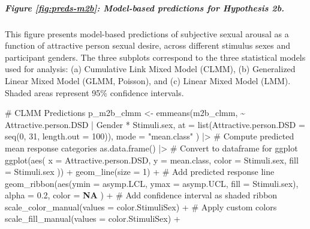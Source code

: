 \documentclass[
  bookmarksnumbered]{article}
\newenvironment{Shaded}{\begin{snugshade}}{\end{snugshade}}
\newcommand{\AttributeTok}[1]{\textcolor[rgb]{0.80,0.80,0.80}{#1}}
\newcommand{\CommentTok}[1]{\textcolor[rgb]{0.50,0.62,0.50}{#1}}
\newcommand{\ConstantTok}[1]{\textcolor[rgb]{0.86,0.64,0.64}{\textbf{#1}}}
\newcommand{\DecValTok}[1]{\textcolor[rgb]{0.86,0.86,0.80}{#1}}
\newcommand{\FloatTok}[1]{\textcolor[rgb]{0.75,0.75,0.82}{#1}}
\newcommand{\FunctionTok}[1]{\textcolor[rgb]{0.94,0.94,0.56}{#1}}
\newcommand{\NormalTok}[1]{\textcolor[rgb]{0.80,0.80,0.80}{#1}}
\newcommand{\OtherTok}[1]{\textcolor[rgb]{0.94,0.94,0.56}{#1}}
\newcommand{\SpecialCharTok}[1]{\textcolor[rgb]{0.86,0.64,0.64}{#1}}
\newcommand{\StringTok}[1]{\textcolor[rgb]{0.80,0.58,0.58}{#1}}
\begin{document}
\subparagraph{Figure \ref{fig:preds-m2b}: Model-based predictions for Hypothesis 2b.}\label{figure-reffigpreds-m2b-model-based-predictions-for-hypothesis-2b.}

This figure presents model-based predictions of subjective sexual arousal as a function of attractive person sexual desire, across different stimulus sexes and participant genders. The three subplots correspond to the three statistical models used for analysis: (a) Cumulative Link Mixed Model (CLMM), (b) Generalized Linear Mixed Model (GLMM, Poisson), and (c) Linear Mixed Model (LMM). Shaded areas represent 95\% confidence intervals.

\begin{Shaded}
\begin{Highlighting}[]
\CommentTok{\# CLMM Predictions}
\NormalTok{p\_m2b\_clmm }\OtherTok{\textless{}{-}} \FunctionTok{emmeans}\NormalTok{(m2b\_clmm, }\SpecialCharTok{\textasciitilde{}}\NormalTok{ Attractive.person.DSD }\SpecialCharTok{|}\NormalTok{ Gender }\SpecialCharTok{*}\NormalTok{ Stimuli.sex,}
  \AttributeTok{at =} \FunctionTok{list}\NormalTok{(}\AttributeTok{Attractive.person.DSD =} \FunctionTok{seq}\NormalTok{(}\DecValTok{0}\NormalTok{, }\DecValTok{31}\NormalTok{, }\AttributeTok{length.out =} \DecValTok{100}\NormalTok{)),}
  \AttributeTok{mode =} \StringTok{"mean.class"}
\NormalTok{) }\SpecialCharTok{|\textgreater{}} \CommentTok{\# Compute predicted mean response categories}
  \FunctionTok{as.data.frame}\NormalTok{() }\SpecialCharTok{|\textgreater{}} \CommentTok{\# Convert to dataframe for ggplot}
  \FunctionTok{ggplot}\NormalTok{(}\FunctionTok{aes}\NormalTok{(}
    \AttributeTok{x =}\NormalTok{ Attractive.person.DSD, }\AttributeTok{y =}\NormalTok{ mean.class,}
    \AttributeTok{color =}\NormalTok{ Stimuli.sex, }\AttributeTok{fill =}\NormalTok{ Stimuli.sex}
\NormalTok{  )) }\SpecialCharTok{+}
  \FunctionTok{geom\_line}\NormalTok{(}\AttributeTok{size =} \DecValTok{1}\NormalTok{) }\SpecialCharTok{+} \CommentTok{\# Add predicted response line}
  \FunctionTok{geom\_ribbon}\NormalTok{(}\FunctionTok{aes}\NormalTok{(}\AttributeTok{ymin =}\NormalTok{ asymp.LCL, }\AttributeTok{ymax =}\NormalTok{ asymp.UCL, }\AttributeTok{fill =}\NormalTok{ Stimuli.sex),}
    \AttributeTok{alpha =} \FloatTok{0.2}\NormalTok{, }\AttributeTok{color =} \ConstantTok{NA}
\NormalTok{  ) }\SpecialCharTok{+} \CommentTok{\# Add confidence interval as shaded ribbon}
  \FunctionTok{scale\_color\_manual}\NormalTok{(}\AttributeTok{values =}\NormalTok{ color.StimuliSex) }\SpecialCharTok{+} \CommentTok{\# Apply custom colors}
  \FunctionTok{scale\_fill\_manual}\NormalTok{(}\AttributeTok{values =}\NormalTok{ color.StimuliSex) }\SpecialCharTok{+}

\end{Highlighting}
\end{Shaded}
\end{document}
